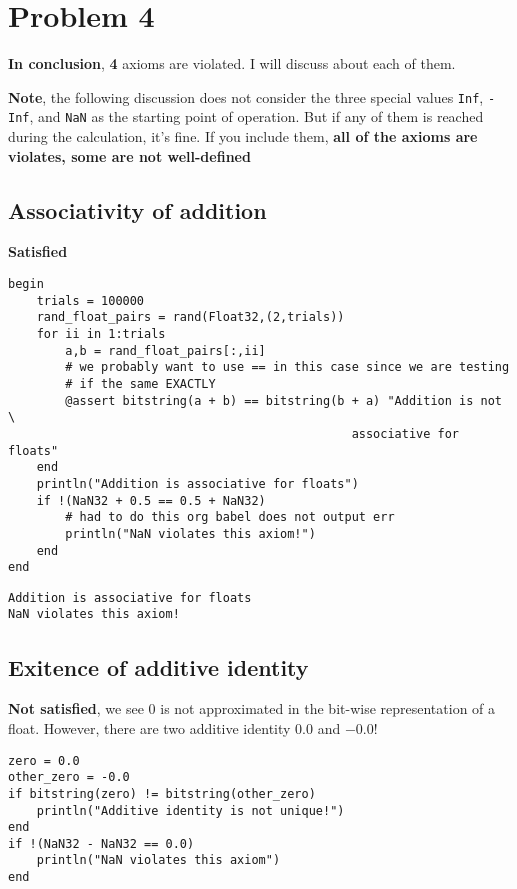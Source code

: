 \documentclass[11pt]{article}
\begin{document}
\section{Problem 4}
\label{sec:org430ab02}
\textbf{In conclusion}, \textbf{4} axioms are violated. I will discuss about each of them.

\textbf{Note}, the following discussion does not consider the three special values
\texttt{Inf}, \texttt{-Inf}, and \texttt{NaN} as the starting point of operation. But if any of them
is reached during the calculation, it's fine. If you include them, \textbf{all of the
axioms are violates, some are not well-defined}

\subsection{Associativity of addition}
\label{sec:orgb97bb6f}
\textbf{Satisfied}

\begin{verbatim}
begin
    trials = 100000
    rand_float_pairs = rand(Float32,(2,trials))
    for ii in 1:trials
        a,b = rand_float_pairs[:,ii]
        # we probably want to use == in this case since we are testing
        # if the same EXACTLY
        @assert bitstring(a + b) == bitstring(b + a) "Addition is not \
                                                associative for floats"
    end
    println("Addition is associative for floats")
    if !(NaN32 + 0.5 == 0.5 + NaN32)
        # had to do this org babel does not output err
        println("NaN violates this axiom!")
    end
end
\end{verbatim}

\begin{verbatim}
Addition is associative for floats
NaN violates this axiom!
\end{verbatim}

\subsection{Exitence of additive identity}
\label{sec:org3e77d95}

\textbf{Not satisfied}, we see \(0\) is not approximated in the bit-wise representation
 of a float. However, there are two additive identity \(0.0\) and \(-0.0\)!
\begin{verbatim}
zero = 0.0
other_zero = -0.0
if bitstring(zero) != bitstring(other_zero)
    println("Additive identity is not unique!")
end
if !(NaN32 - NaN32 == 0.0)
    println("NaN violates this axiom")
end
\end{verbatim}
\end{document}
